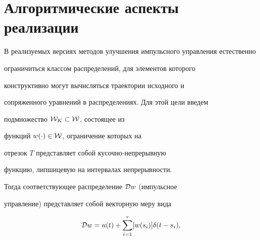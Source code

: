 




\section{Алгоритмические аспекты реализации}





В реализуемых версиях методов улучшения импульсного управления естественно


ограничиться классом распределений, для элементов которого


конструктивно могут вычисляться траектории исходного и 


сопряженного уравнений в распределениях. Для этой цели введем


подмножество ${\cal W}_K \subset {\cal W}$, состоящее из 


функций $w(\cdot) \in {\cal W}$, ограничение которых на 


отрезок $T$ представляет собой кусочно-непрерывную 


функцию, липшицевую на интервалах непрерывности.


Тогда соответствующее распределение ${\cal D} w$ (импульсное 


управление) представляет собой векторную меру вида


\begin{equation}


{\cal D}w = u(t) + \sum_{i=1}^r[w(s_i)]\delta(t-s_i),


\end{equation}


